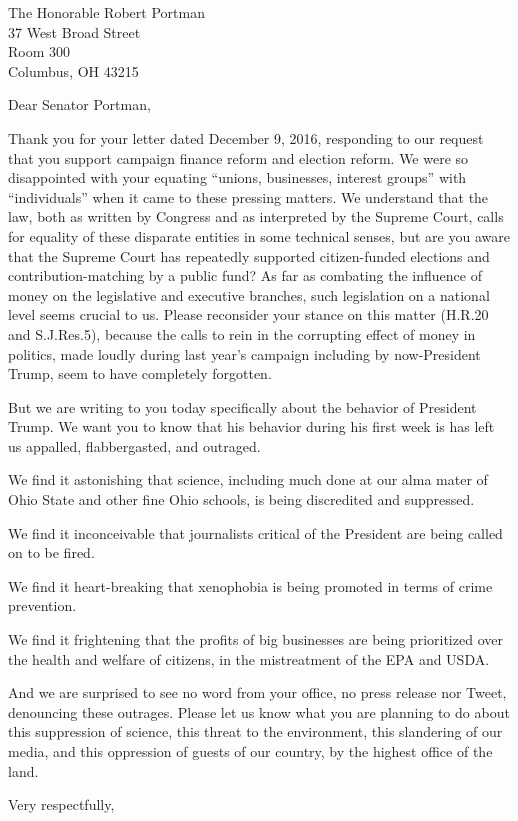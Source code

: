 \documentclass{letter}
\begin{document}
\begin{letter}{
  The Honorable Robert Portman \\
  37 West Broad Street \\
  Room 300 \\
  Columbus, OH 43215}

\opening{Dear Senator Portman,}

Thank you for your letter dated December 9, 2016, responding to our request that you support campaign finance reform and election reform. We were so disappointed with your equating ``unions, businesses, interest groups'' with ``individuals'' when it came to these pressing matters. We understand that the law, both as written by Congress and as interpreted by the Supreme Court, calls for equality of these disparate entities in some technical senses, but are you aware that the Supreme Court has repeatedly supported citizen-funded elections and contribution-matching by a public fund? As far as combating the influence of money on the legislative and executive branches, such legislation on a national level seems crucial to us. Please reconsider your stance on this matter (H.R.20 and S.J.Res.5), because the calls to rein in the corrupting effect of money in politics, made loudly during last year's campaign including by now-President Trump, seem to have completely forgotten.

But we are writing to you today specifically about the behavior of President Trump. We want you to know that his behavior during his first week is has left us appalled, flabbergasted, and outraged.

We find it astonishing that science, including much done at our alma mater of Ohio State and other fine Ohio schools, is being discredited and suppressed.

We find it inconceivable that journalists critical of the President are being called on to be fired.

We find it heart-breaking that xenophobia is being promoted in terms of crime prevention.

We find it frightening that the profits of big businesses are being prioritized over the health and welfare of citizens, in the mistreatment of the EPA and USDA.

And we are surprised to see no word from your office, no press release nor Tweet, denouncing these outrages. Please let us know what you are planning to do about this suppression of science, this threat to the environment, this slandering of our media, and this oppression of guests of our country, by the highest office of the land.

\closing{Very respectfully,}


\end{letter}
\end{document}

